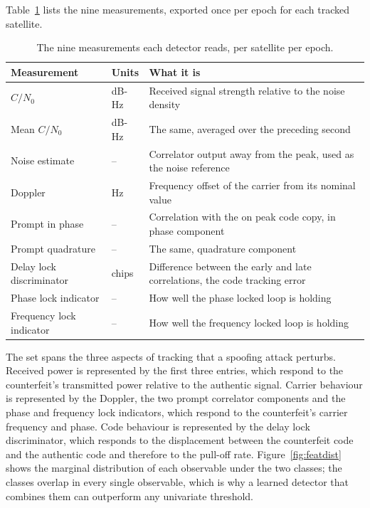 \documentclass[pdflatex,sn-basic]{sn-jnl}
\theoremstyle{thmstyleone}
\theoremstyle{thmstyletwo}
\theoremstyle{thmstylethree}
\begin{document}
Table~\ref{tab:features} lists the nine measurements, exported once per epoch for each
tracked satellite.

\begin{table}[t]
\centering
\caption{The nine measurements each detector reads, per satellite per epoch.}
\label{tab:features}
\begin{tabular}{@{}llp{5.1cm}@{}}
\toprule
Measurement & Units & What it is \\
\midrule
$C/N_0$              & dB-Hz  & Received signal strength relative to the noise density \\
Mean $C/N_0$         & dB-Hz  & The same, averaged over the preceding second \\
Noise estimate       & --     & Correlator output away from the peak, used as the noise
                                reference \\
Doppler              & Hz     & Frequency offset of the carrier from its nominal value \\
Prompt in phase      & --     & Correlation with the on peak code copy, in phase
                                component \\
Prompt quadrature    & --     & The same, quadrature component \\
Delay lock discriminator & chips & Difference between the early and late correlations,
                                the code tracking error \\
Phase lock indicator & --     & How well the phase locked loop is holding \\
Frequency lock indicator & -- & How well the frequency locked loop is holding \\
\bottomrule
\end{tabular}
\end{table}

The set spans the three aspects of tracking that a spoofing attack perturbs. Received
power is represented by the first three entries, which respond to the counterfeit's
transmitted power relative to the authentic signal. Carrier behaviour is represented by
the Doppler, the two prompt correlator components and the phase and frequency lock
indicators, which respond to the counterfeit's carrier frequency and phase. Code behaviour
is represented by the delay lock discriminator, which responds to the displacement between
the counterfeit code and the authentic code and therefore to the pull-off rate.
Figure~\ref{fig:featdist} shows the marginal distribution of each observable under the two
classes; the classes overlap in every single observable, which is why a learned detector
that combines them can outperform any univariate threshold.
\end{document}
